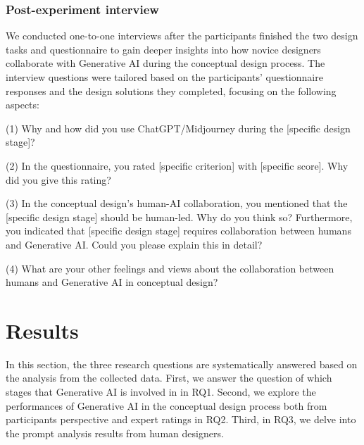 \documentclass{dsj}
\begin{document}

\subsubsection{Post-experiment interview}
We conducted one-to-one interviews after the participants finished the two design tasks and questionnaire to gain deeper insights into how novice designers collaborate with Generative AI during the conceptual design process. The interview questions were tailored based on the participants' questionnaire responses and the design solutions they completed, focusing on the following aspects:

(1) Why and how did you use ChatGPT/Midjourney during the [specific design stage]? 

(2) In the questionnaire, you rated [specific criterion] with [specific score]. Why did you give this rating?

(3) In the conceptual design's human-AI collaboration, you mentioned that the [specific design stage] should be human-led. Why do you think so? Furthermore, you indicated that [specific design stage] requires collaboration between humans and Generative AI. Could you please explain this in detail?

(4) What are your other feelings and views about the collaboration between humans and Generative AI in conceptual design?

\section{Results}
In this section, the three research questions are systematically answered based on the analysis from the collected data. First, we answer the question of which stages that Generative AI is involved in in RQ1. Second, we explore the performances of Generative AI in the conceptual design process both from participants perspective and expert ratings in RQ2. Third, in RQ3, we delve into the prompt analysis results from human designers.
\end{document}
